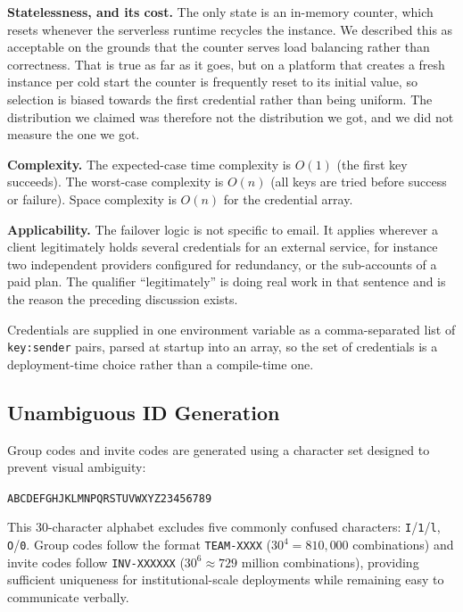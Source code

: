 \documentclass[11pt,a4paper]{article}
\theoremstyle{plain}
\theoremstyle{definition}
\theoremstyle{remark}
\begin{document}
\textbf{Statelessness, and its cost.} The only state is an in-memory counter, which resets whenever the serverless runtime recycles the instance. We described this as acceptable on the grounds that the counter serves load balancing rather than correctness. That is true as far as it goes, but on a platform that creates a fresh instance per cold start the counter is frequently reset to its initial value, so selection is biased towards the first credential rather than being uniform. The distribution we claimed was therefore not the distribution we got, and we did not measure the one we got.

\textbf{Complexity.} The expected-case time complexity is $O(1)$ (the first key succeeds). The worst-case complexity is $O(n)$ (all keys are tried before success or failure). Space complexity is $O(n)$ for the credential array.

\textbf{Applicability.} The failover logic is not specific to email. It applies wherever a client legitimately holds several credentials for an external service, for instance two independent providers configured for redundancy, or the sub-accounts of a paid plan. The qualifier ``legitimately'' is doing real work in that sentence and is the reason the preceding discussion exists.

Credentials are supplied in one environment variable as a comma-separated list of \texttt{key:sender} pairs, parsed at startup into an array, so the set of credentials is a deployment-time choice rather than a compile-time one.

\subsection{Unambiguous ID Generation}

Group codes and invite codes are generated using a character set designed to prevent visual ambiguity:

\begin{center}
\texttt{ABCDEFGHJKLMNPQRSTUVWXYZ23456789}
\end{center}

This 30-character alphabet excludes five commonly confused characters: \texttt{I}/\texttt{1}/\texttt{l}, \texttt{O}/\texttt{0}. Group codes follow the format \texttt{TEAM-XXXX} ($30^4 = 810{,}000$ combinations) and invite codes follow \texttt{INV-XXXXXX} ($30^6 \approx 729$ million combinations), providing sufficient uniqueness for institutional-scale deployments while remaining easy to communicate verbally.
\end{document}
